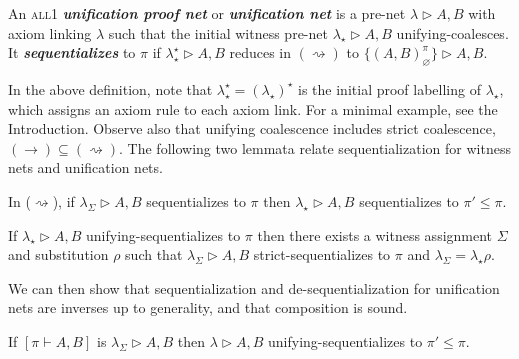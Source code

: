 \documentclass[UKenglish]{lipics-v2019}
\newcommand\defn[1]{\textit{\textbf{#1}}}
\newcommand\all{\textsc{all}}
\newcommand\+{+}
\renewcommand\*{\times}
\newcommand\prf[3]{#1\vdash\!#2,#3}
\newcommand\net[3]{#1\triangleright #2,#3}
\newcommand\link[3][\sigma]{(#2,#3)_{#1}}
\newcommand\scoal{\rightarrow} %
\newcommand\ucoal{\rightsquigarrow}
\begin{document}
\begin{definition}
An \all{\textnormal 1} \defn{unification proof net} or \defn{unification net} is a pre-net $\net\lambda AB$ with axiom linking $\lambda$ such that the initial witness pre-net $\net{\lambda_\star}AB$ unifying-coalesces. It \defn{sequentializes} to $\pi$ if $\net{\lambda^\star_\star}AB$ reduces in $(\ucoal)$ to $\net{\{\link[\varnothing]AB^\pi\}}AB$.
\end{definition}

In the above definition, note that $\lambda_\star^\star=(\lambda_\star)^\star$ is the initial proof labelling of $\lambda_\star$, which assigns an axiom rule to each axiom link. For a minimal example, see the Introduction. Observe also that unifying coalescence includes strict coalescence, $(\scoal)\subseteq(\ucoal)$. The following two lemmata relate sequentialization for witness nets and unification nets.

\begin{lemma}
\label{lem:ucoal generality}
In ($\ucoal$), if $\net{\lambda_\Sigma}AB$ sequentializes to $\pi$ then $\net{\lambda_\star}AB$ sequentializes to $\pi'\leq\pi$.
\end{lemma}

\begin{lemma}
\label{lem:unifying implies strict coalescence}
If $\net{\lambda_\star}AB$ unifying-sequentializes to $\pi$ then there exists a witness assignment $\Sigma$ and substitution $\rho$ such that $\net{\lambda_\Sigma}AB$ strict-sequentializes to $\pi$ and $\lambda_\Sigma=\lambda_\star\rho$.
\end{lemma}

We can then show that sequentialization and de-sequentialization for unification nets are inverses up to generality, and that composition is sound.

\begin{theorem}
\label{thm:unet deseq-seq}
If $[\prf\pi AB]$ is $\net{\lambda_\Sigma}AB$ then $\net\lambda AB$ unifying-sequentializes to $\pi'\leq \pi$.
\end{theorem}
\end{document}
